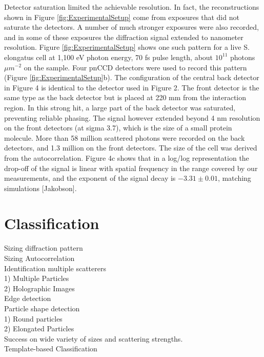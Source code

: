 Detector saturation limited the achievable resolution.  In fact, the reconstructions shown in Figure \ref{fig:ExperimentalSetup} come from exposures that did not saturate the detectors. A number of much stronger exposures were also recorded, and in some of these exposures the diffraction signal extended to nanometer resolution. Figure \ref{fig:ExperimentalSetup} shows one such pattern for a live S. elongatus cell at 1,100 eV photon energy, 70 fs pulse length, about $10^11$ photons $\mu m^{-2}$ on the sample. Four pnCCD detectors were used to record this pattern (Figure \ref{fig:ExperimentalSetup}b). The configuration of the central back detector in Figure 4 is identical to the detector used in Figure 2. The front detector is the same type as the back detector but is placed at 220 mm from the interaction region. In this strong hit, a large part of the back detector was saturated, preventing reliable phasing. The signal however extended beyond 4 nm resolution on the front detectors (at sigma 3.7), which is the size of a small protein molecule. More than 58 million scattered photons were recorded on the back detectors, and 1.3 million on the front detectors. The size of the cell was derived from the autocorrelation. Figure 4c shows that in a log/log representation the drop-off of the signal is linear with spatial frequency in the range covered by our measurements, and the exponent of the signal decay is $-3.31\pm0.01$, matching simulations [Jakobson].

 

\section{Classification}

Sizing diffraction pattern
\\
Sizing Autocorrelation
\\
Identification multiple scatterers
\\	1) Multiple Particles
\\	2) Holographic Images
\\
Edge detection
\\
Particle shape detection
\\	1) Round particles
\\	2) Elongated Particles
\\
Success on wide variety of sizes and scattering strengths.
\\
Template-based Classification
\\

